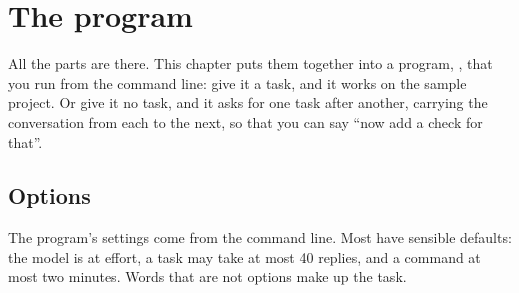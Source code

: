 \chapter{The program}\label{ch:program}

All the parts are there. This chapter puts them together into a program,
, that you run from the command line: give it a task, and
it works on the sample project. Or give it no task, and it asks for one
task after another, carrying the conversation from each to the next, so
that you can say ``now add a check for that''.

\section{Options}

The program's settings come from the command line. Most have sensible
defaults: the model is  at  effort, a task
may take at most 40 replies, and a command at most two minutes. Words that
are not options make up the task.

